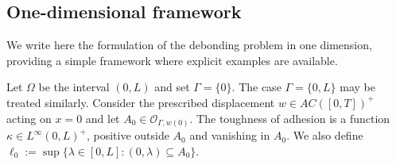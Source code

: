 \documentclass[a4paper,11pt,reqno]{amsart}
\numberwithin{equation}{section}
\theoremstyle{definition}
\theoremstyle{remark}
\begin{document}
\subsection{One-dimensional framework}\label{sec:1d}

We write here the formulation of the debonding problem in one dimension, providing a simple framework where explicit examples are available. 

    Let $\Omega$ be the interval $(0,L)$ and set $\Gamma=\{0\}$. The case $\Gamma=\{0,L\}$ may be treated similarly. Consider the prescribed displacement $w\in AC([0,T])^+$ acting on $x=0$ and let $A_0\in \mathcal O_{\Gamma,w(0)}$. The toughness of adhesion is a function $\kappa\in L^{\infty}(0,L)^+$, positive outside $A_0$ and vanishing in $A_0$. We also define $\ell_0:=\sup\{\lambda\in [0,L]: (0,\lambda)\subseteq A_0\}$.
\end{document}
